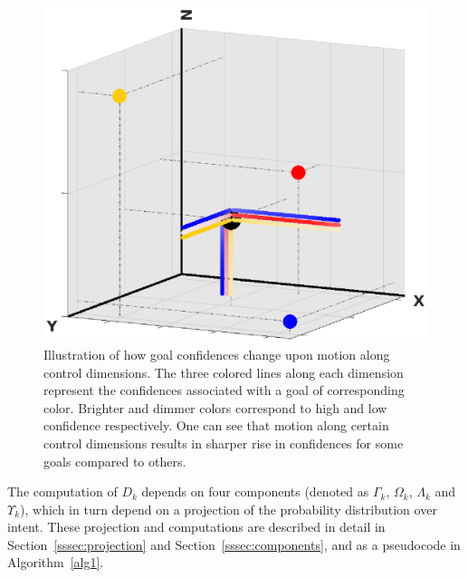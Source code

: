 \begin{figure}[h]
	\centering
	\includegraphics[width = 1\hsize]{./finalfigures/Fig3.eps}
	\caption{Illustration of how goal confidences change upon motion along control dimensions. The three colored lines along each dimension represent the confidences associated with a goal of corresponding color. Brighter and dimmer colors correspond to high and low confidence respectively. One can see that motion along certain control dimensions results in sharper rise in confidences for some goals compared to others.}
	\label{fig:disamb_motivation}
\end{figure}
The computation of $D_k$ depends on four components (denoted as $\Gamma_k$, $\Omega_k$, $\Lambda_k$ and $\Upsilon_k$), which in turn depend on a projection of the probability distribution over intent. These projection and computations are described in detail in Section~\ref{sssec:projection} and Section~\ref{sssec:components}, and as a pseudocode in Algorithm~\ref{alg1}. 


